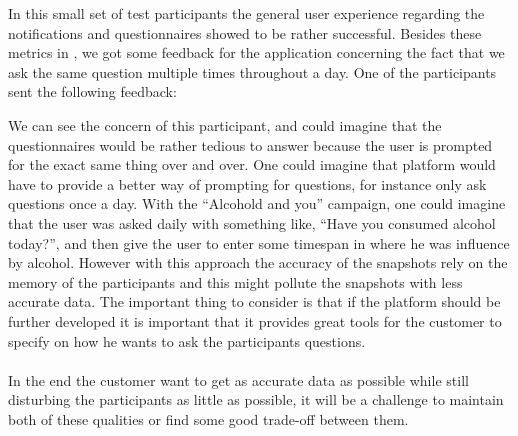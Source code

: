 In this small set of test participants the general user experience regarding the notifications and questionnaires showed to be rather successful. Besides these metrics in , we got some feedback for the application concerning the fact that we ask the same question multiple times throughout a day. One of the participants sent the following feedback:

\begin{quote}
\end{quote}

We can see the concern of this participant, and could imagine that the questionnaires would be rather tedious to answer because the user is prompted for the exact same thing over and over. One could imagine that platform would have to provide a better way of prompting for questions, for instance only ask questions once a day. With the ``Alcohold and you'' campaign, one could imagine that the user was asked daily with something like, ``Have you consumed alcohol today?'', and then give the user to enter some timespan in where he was influence by alcohol. However with this approach the accuracy of the snapshots rely on the memory of the participants and this might pollute the snapshots with less accurate data. The important thing to consider is that if the platform should be further developed it is important that it provides great tools for the customer to specify on how he wants to ask the participants questions. 
\\\\
In the end the customer want to get as accurate data as possible while still disturbing the participants as little as possible, it will be a challenge to maintain both of these qualities or find some good trade-off between them.